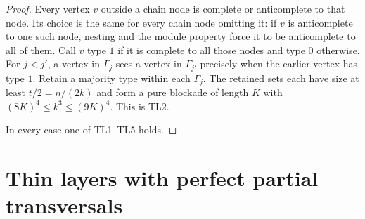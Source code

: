\documentclass[11pt,a4paper]{article}
\theoremstyle{definition}
\theoremstyle{remark}
\numberwithin{equation}{section}
\begin{document}
\begin{proof}
Every vertex \(v\) outside a chain node is complete or anticomplete to that node. Its choice is the same for every chain node omitting it: if \(v\) is anticomplete to one such node, nesting and the module property force it to be anticomplete to all of them. Call \(v\) type \(1\) if it is complete to all those nodes and type \(0\) otherwise. For \(j<j'\), a vertex in \(\Gamma_{j}\) sees a vertex in \(\Gamma_{j'}\) precisely when the earlier vertex has type \(1\). Retain a majority type within each \(\Gamma_{j}\). The retained sets each have size at least \(t/2=n/(2k)\) and form a pure blockade of length \(K\) with \((8K)^{4}\le\allowbreak k^{3}\le\allowbreak (9K)^{4}\). This is TL2.

In every case one of TL1--TL5 holds.
\end{proof}

\section{Thin layers with perfect partial transversals}\label{app:thin}
\end{document}
